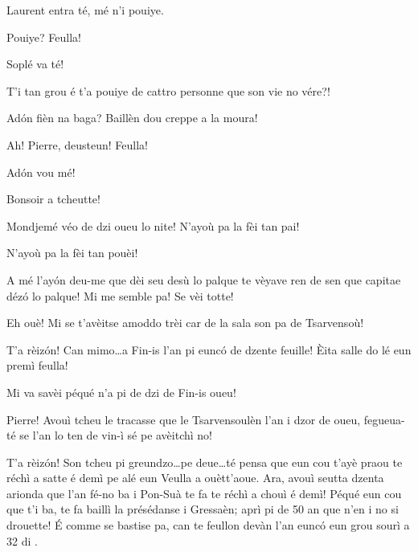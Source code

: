 \DramPer


\begin{drama}

\Pierrespeaks Laurent entra té, mé n'i pouiye.

\Laurentspeaks Pouiye? Feulla!

\Pierrespeaks {} Soplé va té!

\Laurentspeaks T'i tan grou é t'a pouiye de cattro personne que son vie no vére?!

\Pierrespeaks Ad\'on fièn na baga? Baillèn dou creppe a la moura!


\Laurentspeaks Ah! Pierre, deusteun! Feulla!

\Pierrespeaks{} Ad\'on vou mé!


\Pierrespeaks Bonsoir a tcheutte!


\Pierrespeaks{} Mondjemé véo de dzi oueu lo nite! N'ayoù pa la fèi tan pai!

\Laurentspeaks{} N'ayoù pa la fèi tan pouèi!

\Pierrespeaks A mé l'ay\'on deu-me que dèi seu desù lo palque te vèyave ren de sen que capitae déz\'o lo palque!  Mi me semble pa! Se vèi totte!

\Laurentspeaks Eh ouè! Mi se t'avèitse amoddo trèi car de la sala son pa de Tsarvensoù!

\Pierrespeaks T'a rèiz\'on! Can mimo\ldots a Fin-is l'an pi eunc\'o de dzente feuille! \`Eita salle do lé eun premì feulla!


\Pierrespeaks Mi va savèi péqué n'a pi de dzi de Fin-is oueu!

\Laurentspeaks Pierre! Avouì tcheu le tracasse que le Tsarvensoulèn l'an i dzor de oueu, fegueua-té se l'an lo ten de vin-ì sé pe avèitchì no!

\Pierrespeaks T'a rèiz\'on! Son tcheu pi greundzo\ldots pe deue\ldots té pensa que eun cou t'ayè praou te réchì a satte é demì pe alé eun Veulla a ouètt'aoue. Ara, avouì seutta dzenta arionda que l'an fé-no ba i Pon-Suà te fa te réchì a chouì é demì! Péqué eun cou que t'i  ba, te fa baillì la présédanse i Gressaèn; aprì pi de 50 an que n'en i no si drouette! \'E comme se bastise pa, can te feullon devàn l'an eunc\'o eun grou sourì a 32 di \sorrisone .


\end{drama}
